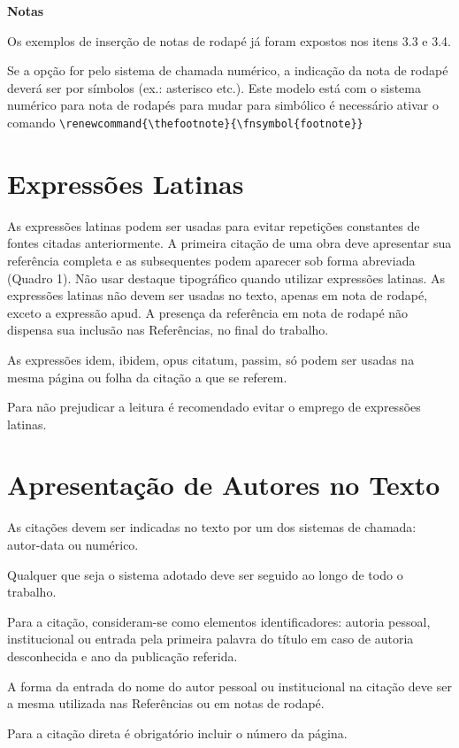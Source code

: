 \textbf{Notas}

Os exemplos de inserção de notas de rodapé já foram expostos nos itens 3.3 e 3.4.

Se a opção for pelo sistema de chamada numérico, a indicação da nota de rodapé deverá ser por símbolos (ex.: asterisco etc.). 
Este modelo está com o sistema numérico para nota de rodapés para mudar para simbólico é necessário ativar o comando \verb+\renewcommand{\thefootnote}{\fnsymbol{footnote}}+

\section{Expressões Latinas}

As expressões latinas podem ser usadas para evitar repetições
constantes de fontes citadas anteriormente. A primeira citação de uma obra
deve apresentar sua referência completa e as subsequentes podem aparecer
sob forma abreviada (Quadro 1).
Não usar destaque tipográfico quando utilizar expressões latinas.
As expressões latinas não devem ser usadas no texto, apenas em nota
de rodapé, exceto a expressão apud.
A presença da referência em nota de rodapé não dispensa sua inclusão
nas Referências, no final do trabalho.

As expressões idem, ibidem, opus citatum, passim, só podem ser usadas na mesma página ou folha da citação a que se referem.

Para não prejudicar a leitura é recomendado evitar o emprego de
expressões latinas.


\section{Apresentação de Autores no Texto}

As citações devem ser indicadas no texto por um dos sistemas de chamada: autor-data ou numérico.

Qualquer que seja o sistema adotado deve ser seguido ao longo de todo o trabalho. 

Para a citação, consideram-se como elementos identificadores: autoria pessoal, institucional ou entrada pela primeira palavra do título em caso de autoria desconhecida e ano da publicação referida.

A forma da entrada do nome do autor pessoal ou institucional na citação deve ser a mesma utilizada nas Referências ou em notas de rodapé.

Para a citação direta é obrigatório incluir o número da página.

